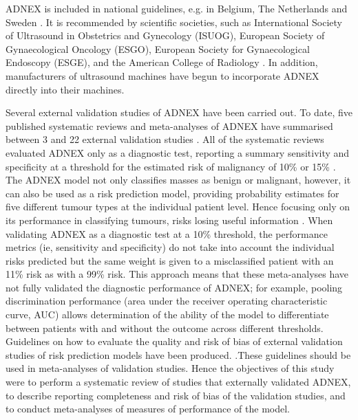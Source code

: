 \gls{ADNEX} is included in national guidelines, e.g. in Belgium, The Netherlands and
Sweden
 \cite{RegionalaCancercentrumSamverkan2023,
ignaceEierstokkankerDiagnoseBehandeling2016,geominipZonMwProjACCEPTAccuracy2021}.
It is recommended by scientific societies, such as International Society of
Ultrasound in Obstetrics and Gynecology (\gls{ISUOG}), European Society of
Gynaecological Oncology (\gls{ESGO}), European Society for Gynaecological Endoscopy
(\gls{ESGE}), and the American College of Radiology
 \cite{timmermanESGOISUOGIOTA2021,
andreottiORADSUSRisk2020}. In addition,
manufacturers of ultrasound machines have begun to incorporate \gls{ADNEX} directly
into their machines.

Several external validation studies of \gls{ADNEX} have been carried out. To date,
five published systematic reviews and meta-analyses of \gls{ADNEX} have summarised
between 3 and 22 external validation studies
 \cite{cuiDiagnosticAccuraciesUltrasound2022,
davenportMenopausalStatusUltrasound2022,
huangDiagnosticAccuracyADNEX2021,
westwoodRiskScoresGuide2018,
yueValueAssessmentDifferent2022}.
All of the systematic reviews evaluated \gls{ADNEX} only as a diagnostic test, reporting a
summary sensitivity and specificity at a threshold for the estimated risk of
malignancy of 10\% or 15\%
 \cite{cuiDiagnosticAccuraciesUltrasound2022,
davenportMenopausalStatusUltrasound2022,
huangDiagnosticAccuracyADNEX2021,
westwoodRiskScoresGuide2018,
yueValueAssessmentDifferent2022}.
The ADNEX model not only classifies masses as benign or malignant, however, it can also be used as a risk prediction model, providing probability estimates for five different tumour types at the individual patient level. Hence focusing only on its performance in classifying tumours, risks losing useful information \cite{onbehalfofthetopicgroupevaluatingdiagnostictestsandpredictionmodelsofthestratosinitiativeThreeMythsRisk2019}. When validating ADNEX as a diagnostic test at a 10\% threshold, the performance metrics (ie, sensitivity and specificity) do not take into account the individual risks predicted but the same weight is given to a misclassified patient with an 11\% risk as with a 99\% risk. This approach means that these meta-analyses have not fully validated the diagnostic performance of ADNEX; for example, pooling discrimination performance (area under the receiver operating characteristic curve, \gls{AUC}) allows determination of the ability of the model to differentiate between patients with and without the outcome across different thresholds. Guidelines on how to evaluate the quality and risk of bias of external validation studies of risk prediction models have been produced.
 \cite{debrayGuideSystematicReview2017,
wolffPROBASTToolAssess2019,
snellTransparentReportingMultivariable2023}.These guidelines should be used in meta-analyses of validation studies. Hence the objectives of this study were to perform a systematic review of studies that externally validated ADNEX, to describe reporting completeness and risk of bias of the validation studies, and to conduct meta-analyses of measures of performance of the model.

